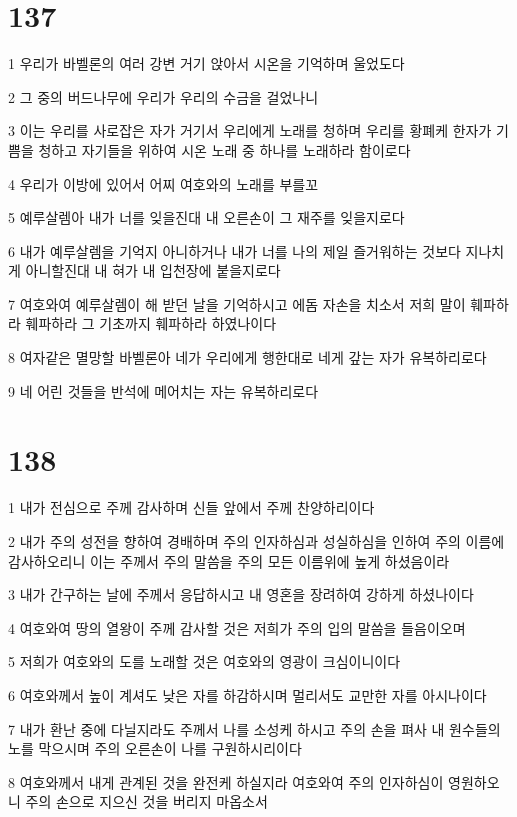 \chapter{137}

\par 1 우리가 바벨론의 여러 강변 거기 앉아서 시온을 기억하며 울었도다
\par 2 그 중의 버드나무에 우리가 우리의 수금을 걸었나니
\par 3 이는 우리를 사로잡은 자가 거기서 우리에게 노래를 청하며 우리를 황폐케 한자가 기쁨을 청하고 자기들을 위하여 시온 노래 중 하나를 노래하라 함이로다
\par 4 우리가 이방에 있어서 어찌 여호와의 노래를 부를꼬
\par 5 예루살렘아 내가 너를 잊을진대 내 오른손이 그 재주를 잊을지로다
\par 6 내가 예루살렘을 기억지 아니하거나 내가 너를 나의 제일 즐거워하는 것보다 지나치게 아니할진대 내 혀가 내 입천장에 붙을지로다
\par 7 여호와여 예루살렘이 해 받던 날을 기억하시고 에돔 자손을 치소서 저희 말이 훼파하라 훼파하라 그 기초까지 훼파하라 하였나이다
\par 8 여자같은 멸망할 바벨론아 네가 우리에게 행한대로 네게 갚는 자가 유복하리로다
\par 9 네 어린 것들을 반석에 메어치는 자는 유복하리로다

\chapter{138}

\par 1 내가 전심으로 주께 감사하며 신들 앞에서 주께 찬양하리이다
\par 2 내가 주의 성전을 향하여 경배하며 주의 인자하심과 성실하심을 인하여 주의 이름에 감사하오리니 이는 주께서 주의 말씀을 주의 모든 이름위에 높게 하셨음이라
\par 3 내가 간구하는 날에 주께서 응답하시고 내 영혼을 장려하여 강하게 하셨나이다
\par 4 여호와여 땅의 열왕이 주께 감사할 것은 저희가 주의 입의 말씀을 들음이오며
\par 5 저희가 여호와의 도를 노래할 것은 여호와의 영광이 크심이니이다
\par 6 여호와께서 높이 계셔도 낮은 자를 하감하시며 멀리서도 교만한 자를 아시나이다
\par 7 내가 환난 중에 다닐지라도 주께서 나를 소성케 하시고 주의 손을 펴사 내 원수들의 노를 막으시며 주의 오른손이 나를 구원하시리이다
\par 8 여호와께서 내게 관계된 것을 완전케 하실지라 여호와여 주의 인자하심이 영원하오니 주의 손으로 지으신 것을 버리지 마옵소서

